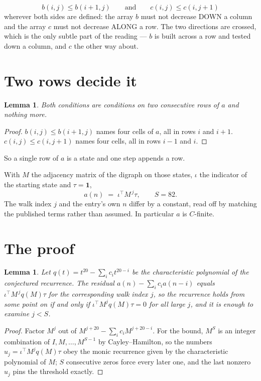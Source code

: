 \documentclass[11pt,a4paper]{article}
\theoremstyle{plain}
\newtheorem{lemma}[theorem]{Lemma}
\theoremstyle{definition}
\begin{document}
\[
b(i,j)\le b(i{+}1,j)\qquad\text{and}\qquad c(i,j)\le c(i,j{+}1)
\]
wherever both sides are defined: the array $b$ must not decrease DOWN a column and the array
$c$ must not decrease ALONG a row. The two directions are crossed, which is the only subtle
part of the reading --- $b$ is built across a row and tested down a column, and $c$ the other
way about.


\section{Two rows decide it}

\begin{lemma}\label{lem:win}
Both conditions are conditions on two consecutive rows of $a$ and nothing more.
\end{lemma}

\begin{proof}
$b(i,j)\le b(i{+}1,j)$ names four cells of $a$, all in rows $i$ and $i+1$. $c(i,j)\le
c(i,j{+}1)$ names four cells, all in rows $i-1$ and $i$.
\end{proof}

So a single row of $a$ is a state and one step appends a row.

With $M$ the adjacency matrix of the digraph on those states, $\iota$ the indicator of the
starting state and $\tau=\mathbf{1}$,
\[
a(n)\;=\;\iota^{\!\top}M^{\,j}\tau ,\qquad S=82.
\]
The walk index $j$ and the entry's own $n$ differ by a constant, read off by matching the
published terms rather than assumed. In particular $a$ is $C$-finite.

\section{The proof}

\begin{lemma}\label{lem:crit}
Let $q(t)=t^{20}-\sum_i c_it^{20-i}$ be the characteristic polynomial of the
conjectured recurrence. The residual $a(n)-\sum_ic_ia(n-i)$ equals
$\iota^{\!\top}M^{\,j}q(M)\tau$ for the corresponding walk index $j$, so the recurrence
holds from some point on if and only if $\iota^{\!\top}M^{j}q(M)\tau=0$ for all large $j$,
and it is enough to examine $j<S$.
\end{lemma}

\begin{proof}
Factor $M^{j}$ out of $M^{j+20}-\sum_ic_iM^{j+20-i}$. For the bound, $M^{S}$
is an integer combination of $I,M,\dots,M^{S-1}$ by Cayley--Hamilton, so the numbers
$u_j=\iota^{\!\top}M^{j}q(M)\tau$ obey the monic recurrence given by the characteristic
polynomial of $M$; $S$ consecutive zeros force every later one, and the last nonzero $u_j$
pins the threshold exactly.
\end{proof}
\end{document}
